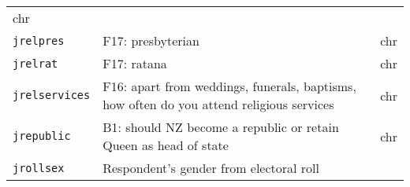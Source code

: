 \documentclass[]{article}
\begin{document}
\begin{longtable}[]{@{}lll@{}}
\begin{minipage}[t]{0.08\columnwidth}
chr\strut
\end{minipage}\tabularnewline
\begin{minipage}[t]{0.14\columnwidth}\raggedright\strut
\texttt{jrelpres}\strut
\end{minipage} & \begin{minipage}[t]{0.70\columnwidth}\raggedright\strut
F17: presbyterian\strut
\end{minipage} & \begin{minipage}[t]{0.08\columnwidth}\raggedright\strut
chr\strut
\end{minipage}\tabularnewline
\begin{minipage}[t]{0.14\columnwidth}\raggedright\strut
\texttt{jrelrat}\strut
\end{minipage} & \begin{minipage}[t]{0.70\columnwidth}\raggedright\strut
F17: ratana\strut
\end{minipage} & \begin{minipage}[t]{0.08\columnwidth}\raggedright\strut
chr\strut
\end{minipage}\tabularnewline
\begin{minipage}[t]{0.14\columnwidth}\raggedright\strut
\texttt{jrelservices}\strut
\end{minipage} & \begin{minipage}[t]{0.70\columnwidth}\raggedright\strut
F16: apart from weddings, funerals, baptisms, how often do you attend
religious services\strut
\end{minipage} & \begin{minipage}[t]{0.08\columnwidth}\raggedright\strut
chr\strut
\end{minipage}\tabularnewline
\begin{minipage}[t]{0.14\columnwidth}\raggedright\strut
\texttt{jrepublic}\strut
\end{minipage} & \begin{minipage}[t]{0.70\columnwidth}\raggedright\strut
B1: should NZ become a republic or retain Queen as head of state\strut
\end{minipage} & \begin{minipage}[t]{0.08\columnwidth}\raggedright\strut
chr\strut
\end{minipage}\tabularnewline
\begin{minipage}[t]{0.14\columnwidth}\raggedright\strut
\texttt{jrollsex}\strut
\end{minipage} & \begin{minipage}[t]{0.70\columnwidth}\raggedright\strut
Respondent's gender from electoral roll\strut

\end{minipage}
\end{longtable}
\end{document}
